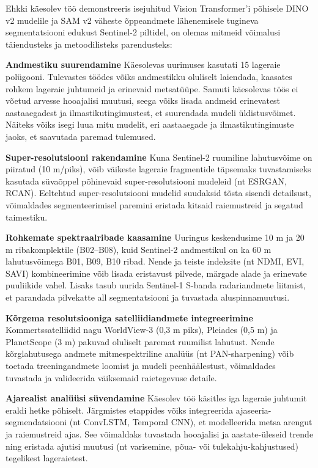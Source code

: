 Ehkki käesolev töö demonstreeris isejuhitud Vision Transformer'i põhisele DINO
v2 mudelile ja SAM v2 väheste õppeandmete lähenemisele tugineva segmentatsiooni
edukust Sentinel-2 piltidel, on olemas mitmeid võimalusi täiendusteks ja
metoodilisteks parendusteks:

\textbf{Andmestiku suurendamine}
Käesolevas uurimuses kasutati 15 lageraie polügooni. Tulevastes töödes võiks
andmestikku oluliselt laiendada, kaasates rohkem lageraie juhtumeid ja
erinevaid metsatüüpe. Samuti käesolevas töös ei võetud arvesse hooajalisi
muutusi, seega võiks lisada andmeid erinevatest aastaaegadest ja ilmastikutingimustest,
et suurendada mudeli üldistusvõimet. Näiteks võiks isegi luua mitu mudelit, eri aastaaegade ja ilmastikutingimuste jaoks, et saavutada paremad tulemused.

\textbf{Super-resolutsiooni rakendamine} 
Kuna Sentinel-2 ruumiline lahutusvõime on
piiratud (10 m/piks), võib väikeste lageraie fragmentide täpsemaks tuvastamiseks
kasutada süvaõppel põhinevaid super-resolutsiooni mudeleid (nt ESRGAN, RCAN).
Eeltehtud super-resolutsiooni mudelid suudaksid tõsta sisendi detailsust,
võimaldades segmenteerimisel paremini eristada kitsaid raiemustreid ja segatud
taimestiku.

\textbf{Rohkemate spektraalribade kaasamine} Uuringus keskendusime 10 m ja 20 m
riba­komplektile (B02--B08), kuid Sentinel-2 andmestikul on ka 60 m
lahutusvõimega B01, B09, B10 ribad. Nende ja teiste indeksite (nt NDMI, EVI,
SAVI) kombineerimine võib lisada eristavust pilvede, märgade alade ja erinevate
puuliikide vahel. Lisaks tasub uurida Sentinel-1 S-banda radariandmete liitmist,
et parandada pilvekatte all segmentatsiooni ja tuvastada aluspinnamuutusi.

\textbf{Kõrgema resolutsiooniga satelliidiandmete integreerimine} Kommertssatelliidid
nagu WorldView-3 (0,3 m piks), Pleiades (0,5 m) ja PlanetScope (3 m) pakuvad
oluliselt paremat ruumilist lahutust. Nende kõrglahutusega andmete
mitmespektriline analüüs (nt PAN-sharpening) võib toetada treeningandmete
loomist ja mudeli peenhäälestust, võimaldades tuvastada ja valideerida
väiksemaid raietegevuse detaile.

\textbf{Ajarealist analüüsi süvendamine} Käesolev töö käsitles iga lageraie juhtumit
eraldi hetke põhiselt. Järgmistes etappides võiks integreerida
ajaseeria-segmendatsiooni (nt ConvLSTM, Temporal CNN), et modelleerida metsa
arengut ja raiemustreid ajas. See võimaldaks tuvastada hooajalisi ja
aastate-üleseid trende ning eristada ajutisi muutusi (nt varisemine, põua- või
tulekahju-kahjustused) tegelikest lageraietest.

